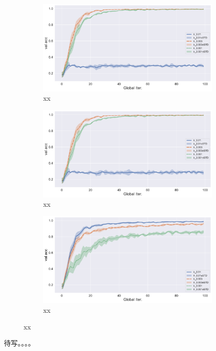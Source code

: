 \begin{figure}[ht]
\centering
\begin{subfigure}{.5\textwidth}
  \centering
  \includegraphics[width=.95\linewidth]{figures/adam-sample-30-compare-lr-val-acc.pdf}
  \caption{xx}
  \label{fig:adam-sample-30-compare-lr-val-acc}
\end{subfigure}%
\begin{subfigure}{.5\textwidth}
  \centering
  \includegraphics[width=.95\linewidth]{figures/yogi-sample-30-compare-lr-val-acc.pdf}
  \caption{xx}
  \label{fig:yogi-sample-30-compare-lr-val-acc}
\end{subfigure}
\begin{subfigure}{.6\textwidth}
  \centering
  \includegraphics[width=.95\linewidth]{figures/adagrad-sample-30-compare-lr-val-acc.pdf}
  \caption{xx}
  \label{fig:adagrad-sample-30-compare-lr-val-acc}
\end{subfigure}
\caption{xx}
\label{fig:fedopt-sample-30-compare-lr-val-acc}
\end{figure}

待写。。。。

